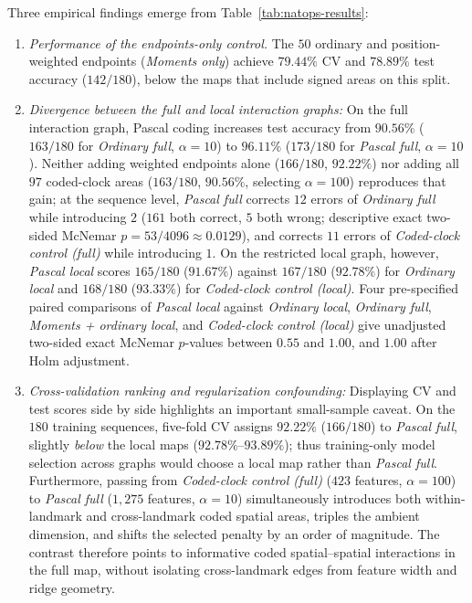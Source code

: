 Three empirical findings emerge from Table~\ref{tab:natops-results}:
\begin{enumerate}
\item \emph{Performance of the endpoints-only control.} The \(50\) ordinary and
position-weighted endpoints (\emph{Moments only}) achieve \(79.44\%\) CV and
\(78.89\%\) test accuracy (\(142/180\)), below the maps that include signed areas
on this split.
\item \emph{Divergence between the full and local interaction graphs:} On the
full interaction graph, Pascal coding increases test accuracy from \(90.56\%\)
(\(163/180\) for \emph{Ordinary full}, \(\alpha = 10\)) to \(96.11\%\)
(\(173/180\) for \emph{Pascal full}, \(\alpha = 10\)). Neither adding weighted
endpoints alone (\(166/180\), \(92.22\%\)) nor adding all \(97\) coded-clock
areas (\(163/180\), \(90.56\%\), selecting \(\alpha = 100\)) reproduces that
gain; at the sequence level, \emph{Pascal full} corrects \(12\) errors of
\emph{Ordinary full} while introducing \(2\) (\(161\) both correct, \(5\) both
wrong; descriptive exact two-sided McNemar \(p = 53/4096 \approx 0.0129\)), and
corrects \(11\) errors of \emph{Coded-clock control (full)} while introducing
\(1\). On the restricted local graph, however, \emph{Pascal local} scores
\(165/180\) (\(91.67\%\)) against \(167/180\) (\(92.78\%\)) for \emph{Ordinary
local} and \(168/180\) (\(93.33\%\)) for \emph{Coded-clock control (local)}. Four
pre-specified paired comparisons of \emph{Pascal local} against \emph{Ordinary
local}, \emph{Ordinary full}, \emph{Moments + ordinary local}, and
\emph{Coded-clock control (local)} give unadjusted two-sided exact McNemar
\(p\)-values between \(0.55\) and \(1.00\), and \(1.00\) after Holm adjustment.
\item \emph{Cross-validation ranking and regularization confounding:} Displaying
CV and test scores side by side highlights an important small-sample caveat. On
the \(180\) training sequences, five-fold CV assigns \(92.22\%\) (\(166/180\)) to
\emph{Pascal full}, slightly \emph{below} the local maps (\(92.78\%\)--\(93.89\%\));
thus training-only model selection across graphs would choose a local map rather
than \emph{Pascal full}. Furthermore, passing from \emph{Coded-clock control
(full)} (\(423\) features, \(\alpha = 100\)) to \emph{Pascal full} (\(1{,}275\)
features, \(\alpha = 10\)) simultaneously introduces both within-landmark and
cross-landmark coded spatial areas, triples the ambient dimension, and shifts the
selected penalty by an order of magnitude. The contrast therefore points to
informative coded spatial--spatial interactions in the full map, without
isolating cross-landmark edges from feature width and ridge geometry.
\end{enumerate}
\FloatBarrier
